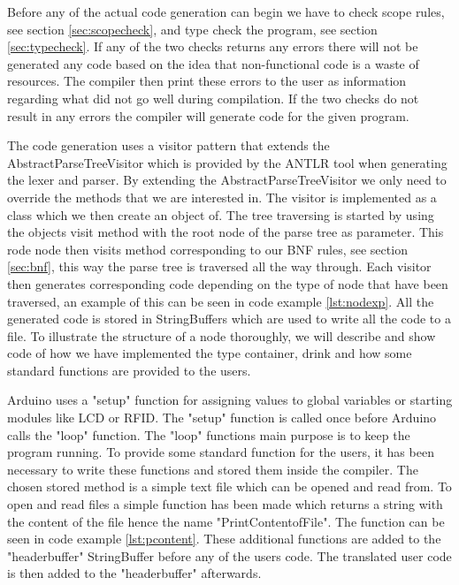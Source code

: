 Before any of the actual code generation can begin we have to check scope rules, see section \ref{sec:scopecheck}, and type check the program, see section \ref{sec:typecheck}. If any of the two checks returns any errors there will not be generated any code based on the idea that non-functional code is a waste of resources. The compiler then print these errors to the user as information regarding what did not go well during compilation. If the two checks do not result in any errors the compiler will generate code for the given program.


The code generation uses a visitor pattern that extends the AbstractParseTreeVisitor which is provided by the ANTLR tool when generating the lexer and parser. By extending the AbstractParseTreeVisitor we only need to override the methods that we are interested in. The visitor is implemented as a class which we then create an object of. The tree traversing is started by using the objects visit method with the root node of the parse tree as parameter. This rode node then visits method corresponding to our BNF rules, see section \ref{sec:bnf}, this way the parse tree is traversed all the way through. Each visitor then generates corresponding code depending on the type of node that have been traversed, an example of this can be seen in code example \ref{lst:nodexp}. All the generated code is stored in StringBuffers which are used to write all the code to a file. To illustrate the structure of a node thoroughly, we will describe and show code of how we have implemented the type container, drink and how some standard functions are provided to the users.


Arduino uses a "setup" function for assigning values to global variables or starting modules like LCD or RFID. The "setup" function is called once before Arduino calls the "loop" function. The "loop" functions main purpose is to keep the program running. To provide some standard function for the users, it has been necessary to write these functions and stored them inside the compiler. The chosen stored method is a simple text file which can be opened and read from. To open and read files a simple function has been made which returns a string with the content of the file hence the name "PrintContentofFile". The function can be seen in code example \ref{lst:pcontent}. These additional functions are added to the "headerbuffer" StringBuffer before any of the users code. The translated user code is then added to the "headerbuffer" afterwards.

